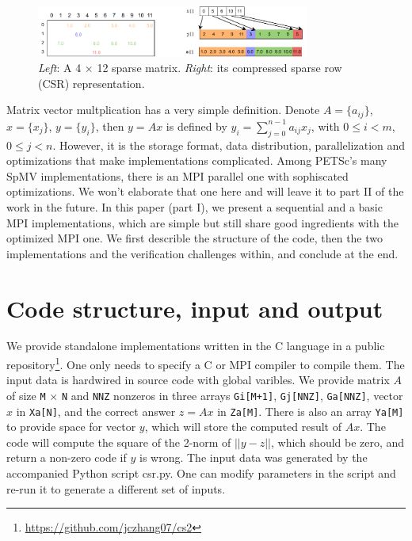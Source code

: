 \documentclass[creativecommons]{eptcs}
\begin{document}
\begin{figure}[h]
  \centering
  \includegraphics[width=0.8\textwidth]{figs/SEQCSR.pdf}
  \caption{{\it Left}: A 4 $\times$ 12 sparse matrix. {\it Right}:  its compressed sparse row (CSR) representation.}
  \label{fig:seqcsr}
\end{figure}

Matrix vector multplication has a very simple definition.
Denote $A = \{a_{ij}\}$, $x = \{x_j\}$, $y = \{y_i\}$, then $y = Ax$ is defined by
$y_i = \sum_{j=0}^{n-1}a_{ij} x_j$, with $0\leq i < m$, $0 \leq j < n$.
However, it is the storage format, data distribution, parallelization and optimizations
that make implementations complicated.
Among PETSc's many SpMV implementations,
there is an MPI parallel one with sophiscated optimizations.
We won't elaborate that one here and will leave it to part II of the work in the future.
In this paper (part I), we present a sequential and a basic MPI implementations, which are simple but still share good
ingredients with the optimized MPI one.
We first describle the structure of the code, then the two implementations and the verification challenges within, and conclude at the end.

\section{Code structure, input and output}
We provide standalone implementations written in the C language in a
public repository\footnote{\url{https://github.com/jczhang07/cs2}}.
One only needs to specify a C or MPI compiler to compile them.
The input data is hardwired in source code with global varibles.
We provide matrix $A$ of size {\tt M} $\times$ {\tt N} and {\tt NNZ} nonzeros in three arrays
{\tt Gi[M+1]}, {\tt Gj[NNZ]}, {\tt Ga[NNZ]},
vector $x$ in {\tt Xa[N]}, and the correct answer $z = Ax$ in {\tt Za[M]}. There is also an array {\tt Ya[M]}
to provide space for vector $y$, which will store the computed result of $Ax$. The code will compute the square of
the 2-norm of $|| y - z ||$, which should be zero, and return a non-zero code if $y$ is wrong.
The input data was generated by the accompanied Python script csr.py. One can modify parameters in the script and re-run
it to generate a different set of inputs.
\end{document}
